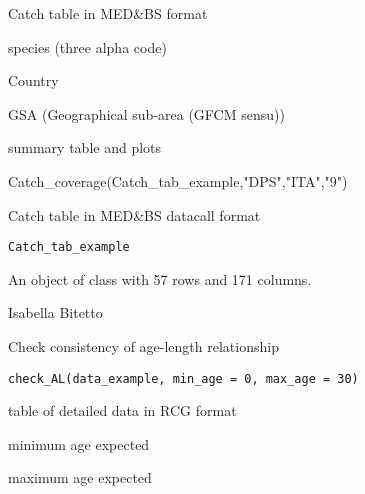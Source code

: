 \documentclass[a4paper]{book}
\begin{document}
%
\begin{Arguments}
\begin{ldescription}
\item[\code{Catch\_tab}] Catch table in MED\&BS format

\item[\code{SP}] species (three alpha code)

\item[\code{MS}] Country

\item[\code{GSA}] GSA (Geographical sub-area (GFCM sensu))
\end{ldescription}
\end{Arguments}
%
\begin{Value}
summary table and plots
\end{Value}
%
\begin{Examples}
\begin{ExampleCode}
Catch_coverage(Catch_tab_example,"DPS","ITA","9")
\end{ExampleCode}
\end{Examples}
%
\begin{Description}\relax
Catch table in MED\&BS datacall format
\end{Description}
%
\begin{Usage}
\begin{verbatim}
Catch_tab_example
\end{verbatim}
\end{Usage}
%
\begin{Format}
An object of class  with 57 rows and 171 columns.
\end{Format}
%
\begin{Author}\relax
Isabella Bitetto 
\end{Author}
%
\begin{Description}\relax
Check consistency of age-length relationship
\end{Description}
%
\begin{Usage}
\begin{verbatim}
check_AL(data_example, min_age = 0, max_age = 30)
\end{verbatim}
\end{Usage}
%
\begin{Arguments}
\begin{ldescription}
\item[\code{data\_example}] table of detailed data in RCG format

\item[\code{min\_age}] minimum age expected

\item[\code{max\_age}] maximum age expected
\end{ldescription}
\end{Arguments}
\end{document}
